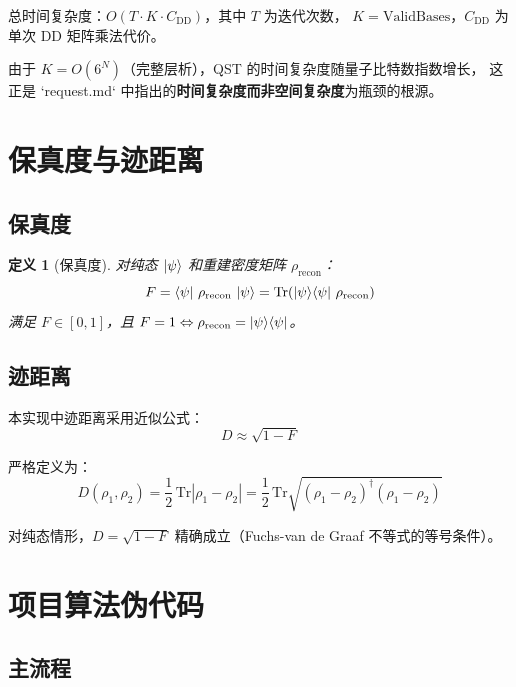 \documentclass[12pt, a4paper]{article}
\newtheorem{definition}{定义}
\begin{document}
总时间复杂度：$O(T \cdot K \cdot C_{\mathrm{DD}})$，其中 $T$ 为迭代次数，
$K = \mathrm{ValidBases}$，$C_{\mathrm{DD}}$ 为单次 DD 矩阵乘法代价。

由于 $K = O(6^N)$（完整层析），QST 的时间复杂度随量子比特数指数增长，
这正是 `request.md` 中指出的\textbf{时间复杂度而非空间复杂度}为瓶颈的根源。

\section{保真度与迹距离}

\subsection{保真度}

\begin{definition}[保真度]
对纯态 $\ket{\psi}$ 和重建密度矩阵 $\rho_{\mathrm{recon}}$：
\[
    F = \bra{\psi}\,\rho_{\mathrm{recon}}\,\ket{\psi}
      = \mathrm{Tr}\!\left(\ket{\psi}\!\bra{\psi}\,\rho_{\mathrm{recon}}\right)
\]
满足 $F \in [0, 1]$，且 $F = 1 \Leftrightarrow \rho_{\mathrm{recon}} = \ket{\psi}\!\bra{\psi}$。
\end{definition}

\subsection{迹距离}

本实现中迹距离采用近似公式：
\[
    D \approx \sqrt{1 - F}
\]

严格定义为：
\[
    D(\rho_1, \rho_2)
    = \frac{1}{2}\,\mathrm{Tr}\!\left|\rho_1 - \rho_2\right|
    = \frac{1}{2}\,\mathrm{Tr}\!\sqrt{(\rho_1 - \rho_2)^\dagger(\rho_1 - \rho_2)}
\]

对纯态情形，$D = \sqrt{1 - F}$ 精确成立（Fuchs-van de Graaf 不等式的等号条件）。

\section{项目算法伪代码}

\subsection{主流程}
\end{document}
